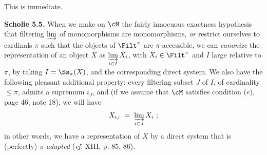 This is immediate.

\textbf{Scholie 5.5.} When we make on $\cM$ the fairly innocuous exactness hypothesis that filtering $\varinjlim$ of monomorphisms are monomorphisms, \textit{or} restrict ourselves to cardinals $\pi$ such that the objects of $\Filt^{\pi}$ are $\pi$-accessible, we can \textit{canonize} the representation of an object $X$ as $\varinjlim\limits_{i\in I} X_i$, with $X_i \in \Filt^{\pi}$ and $I$ large relative to $\pi$, by taking $I = \Ss_{\pi}(X)$, and the corresponding direct system. We also have the following pleasant additional property: every filtering subset $J$ of $I$, of cardinality $\leq \pi$, admits a supremum $i_J$, and (if we assume that $\cM$ satisfies condition ($e$), page 46, note 18), we will have
\[
X_{i_J} \;=\; \varinjlim_{i\in J} X_i \ ;
\]
in other words, we have a representation of $X$ by a direct system that is (perfectly) \textit{$\pi$-adapted} (\textit{cf.} XIII, p. 85, 86).

